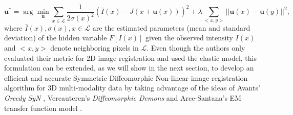 \begin{equation}\label{eq:elastic}
    \mathbf{u}^{*} = \arg \min_{\mathbf{u}} \sum_{x \in \mathcal{L}} \frac{1}{2 \sigma(x)^{2}} ( \bar{I}(x) - J(x + \mathbf{u}(x)))^{2} + \lambda \sum_{<x, y>} ||\mathbf{u}(x) - \mathbf{u}(y)||^{2},
\end{equation}
where $\bar{I}(x), \sigma(x), x\in \mathcal{L}$ are the estimated parameters (mean and standard deviation) of the hidden variable $F[I(x)]$ given the
observed intensity $I(x)$ and $<x, y>$ denote neighboring pixels in $\mathcal{L}$. Even though the authors only evaluated their metric for 2D image registration and used
the elastic model, this formulation can be extended, as we will show in the next section, to develop an efficient and accurate Symmetric Diffeomorphic Non-linear image
registration algorithm for 3D multi-modality data by taking advantage of the ideas of Avants' \textit{Greedy SyN} \cite{Avants2008},
Vercauteren's \textit{Diffeomorphic Demons} \cite{Vercauteren2009}and Arce-Santana's EM transfer function model \cite{Arce-santana2014}.\\
